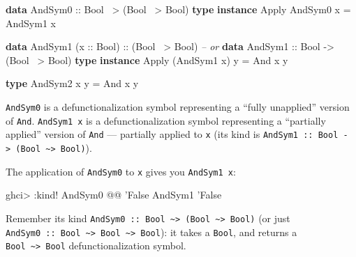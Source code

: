 \documentclass[]{article}
\newenvironment{Shaded}{}{}
\newcommand{\CommentTok}[1]{\textcolor[rgb]{0.38,0.63,0.69}{\textit{#1}}}
\newcommand{\DataTypeTok}[1]{\textcolor[rgb]{0.56,0.13,0.00}{#1}}
\newcommand{\FunctionTok}[1]{\textcolor[rgb]{0.02,0.16,0.49}{#1}}
\newcommand{\KeywordTok}[1]{\textcolor[rgb]{0.00,0.44,0.13}{\textbf{#1}}}
\newcommand{\NormalTok}[1]{#1}
\newcommand{\OtherTok}[1]{\textcolor[rgb]{0.00,0.44,0.13}{#1}}
\begin{document}
\begin{Shaded}
\begin{Highlighting}[]
\KeywordTok{data} \DataTypeTok{AndSym0}\OtherTok{ ::} \DataTypeTok{Bool} \FunctionTok{~>}\NormalTok{ (}\DataTypeTok{Bool} \FunctionTok{~>} \DataTypeTok{Bool}\NormalTok{)}
\KeywordTok{type} \KeywordTok{instance} \DataTypeTok{Apply} \DataTypeTok{AndSym0}\NormalTok{ x }\FunctionTok{=} \DataTypeTok{AndSym1}\NormalTok{ x}

\KeywordTok{data} \DataTypeTok{AndSym1}\NormalTok{ (}\OtherTok{x ::} \DataTypeTok{Bool}\NormalTok{)}\OtherTok{ ::}\NormalTok{ (}\DataTypeTok{Bool} \FunctionTok{~>} \DataTypeTok{Bool}\NormalTok{)}
\CommentTok{-- or}
\KeywordTok{data} \DataTypeTok{AndSym1}\OtherTok{ ::} \DataTypeTok{Bool} \OtherTok{->}\NormalTok{ (}\DataTypeTok{Bool} \FunctionTok{~>} \DataTypeTok{Bool}\NormalTok{)}
\KeywordTok{type} \KeywordTok{instance} \DataTypeTok{Apply}\NormalTok{ (}\DataTypeTok{AndSym1}\NormalTok{ x) y }\FunctionTok{=} \DataTypeTok{And}\NormalTok{ x y}

\KeywordTok{type} \DataTypeTok{AndSym2}\NormalTok{ x y }\FunctionTok{=} \DataTypeTok{And}\NormalTok{ x y}
\end{Highlighting}
\end{Shaded}

\texttt{AndSym0} is a defunctionalization symbol representing a ``fully
unapplied'' version of \texttt{And}. \texttt{AndSym1\ x} is a
defunctionalization symbol representing a ``partially applied'' version of
\texttt{And} --- partially applied to \texttt{x} (its kind is
\texttt{AndSym1\ ::\ Bool\ -\textgreater{}\ (Bool\ \textasciitilde{}\textgreater{}\ Bool)}).

The application of \texttt{AndSym0} to \texttt{x} gives you \texttt{AndSym1\ x}:

\begin{Shaded}
\begin{Highlighting}[]
\NormalTok{ghci}\FunctionTok{>} \FunctionTok{:}\NormalTok{kind}\FunctionTok{!} \DataTypeTok{AndSym0} \FunctionTok{@@}\NormalTok{ '}\DataTypeTok{False}
\DataTypeTok{AndSym1}\NormalTok{ '}\DataTypeTok{False}
\end{Highlighting}
\end{Shaded}

Remember its kind
\texttt{AndSym0\ ::\ Bool\ \textasciitilde{}\textgreater{}\ (Bool\ \textasciitilde{}\textgreater{}\ Bool)}
(or just
\texttt{AndSym0\ ::\ Bool\ \textasciitilde{}\textgreater{}\ Bool\ \textasciitilde{}\textgreater{}\ Bool}):
it takes a \texttt{Bool}, and returns a
\texttt{Bool\ \textasciitilde{}\textgreater{}\ Bool} defunctionalization symbol.
\end{document}
